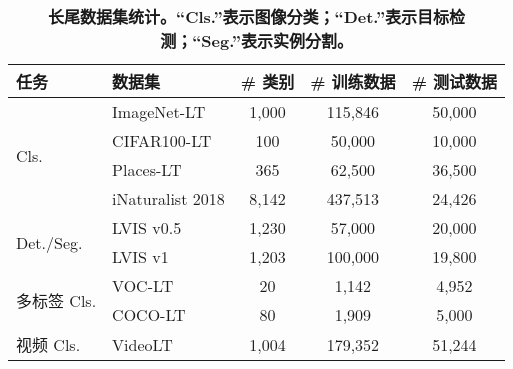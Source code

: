 \begin{table}[htbp]
\scriptsize
\centering
\captionsetup{font=footnotesize}
\caption{\textbf{长尾数据集统计。“Cls.”表示图像分类；“Det.”表示目标检测；“Seg.”表示实例分割。}}
\begin{tabular}{llccc}
\toprule
任务  & 数据集 &  \# 类别 & \# 训练数据 & \# 测试数据 \\
\midrule
\multirow{4}[2]{*}{Cls.} & ImageNet-LT \cite{Liu_2019}  & 1,000 & 115,846 & 50,000 \\
& CIFAR100-LT \cite{cao2019learning}  & 100   & 50,000 & 10,000 \\
& Places-LT \cite{Liu_2019}  & 365   & 62,500 & 36,500 \\
& iNaturalist 2018 \cite{Van_Horn_2018}  & 8,142 & 437,513 & 24,426 \\
\midrule
\multirow{2}[2]{*}{Det./Seg.} & LVIS v0.5 \cite{Gupta_2019}  & 1,230 & 57,000 & 20,000 \\
& LVIS v1 \cite{Gupta_2019}  & 1,203 & 100,000 & 19,800 \\
\midrule
\multirow{2}[2]{*}{多标签 Cls.} & VOC-LT \cite{Wu_2020_dist}  & 20    & 1,142 & 4,952 \\
& COCO-LT \cite{Wu_2020_dist}  & 80    & 1,909 & 5,000 \\
\midrule
视频 Cls.  & VideoLT \cite{Zhang_2021_video}  & 1,004 & 179,352 & 51,244 \\
\bottomrule
\end{tabular}%
\label{tab:1}%
\end{table}%
